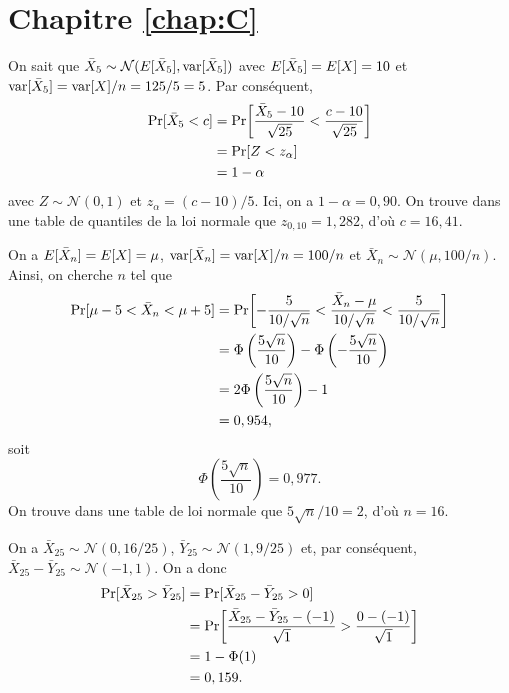 \section*{Chapitre \ref{chap:C}}

\begin{solution}{2.1}
    On sait que $\bar{X}_{5} \sim \mathcal{N}(E [ \bar{X}_{5} ], \mathrm{var} [ \bar{X}_{5} ])$ avec
      $E [ \bar{X}_{5} ] = E [ X ] = 10$ et $\mathrm{var} [ \bar{X}_{5} ] = \mathrm{var} [ X ]/n =
      125/5 = 5$. Par conséquent,
    \begin{align*}
      \prob{\bar{X}_{5} < c}
      &= \Prob{\frac{\bar{X}_{5} - 10}{\sqrt{25}} < %
        \frac{c - 10}{\sqrt{25}}} \\
      &= \prob{Z < z_\alpha} \\
      &= 1 - \alpha
    \end{align*}
    avec $Z \sim \mathcal{N}(0, 1)$ et $z_\alpha = (c - 10)/5$. Ici, on a $1 -
    \alpha = 0,90$. On trouve dans une table de quantiles de la loi
    normale que $z_{0,10} = 1,282$, d'où $c = 16,41$.
  
\end{solution}
\begin{solution}{2.2}
    On a $E [ \bar{X}_n ] = E [ X ] = \mu$, $\mathrm{var} [ \bar{X}_n ] = \mathrm{var} [ X ]/n =
    100/n$ et $\bar{X}_n\sim \mathcal{N}(\mu, 100/n)$. Ainsi, on cherche $n$ tel
    que
    \begin{align*}
      \prob{\mu - 5 < \bar{X}_n< \mu + 5}
      &= \Prob{-\frac{5}{10/\sqrt{n}} < %
        \frac{\bar{X}_n- \mu}{10/\sqrt{n}} < %
        \frac{5}{10/\sqrt{n}}} \\
      &= \Phi\left( \frac{5 \sqrt{n}}{10} \right)
      - \Phi\left( -\frac{5 \sqrt{n}}{10} \right) \\
      &= 2 \Phi\left( \frac{5\sqrt{n}}{10} \right) - 1 \\
      &= 0,954,
    \end{align*}
    soit
    \begin{equation*}
     \Phi \left( \frac{5\sqrt{n}}{10} \right) = 0,977.
    \end{equation*}
    On trouve dans une table de loi normale que $5 \sqrt{n}/10 = 2$,
    d'où $n = 16$.
  
\end{solution}
\begin{solution}{2.3}
    On a $\bar{X}_{25} \sim \mathcal{N}(0, 16/25)$, $\bar{Y}_{25} \sim \mathcal{N}(1, 9/25)$ et, par
    conséquent, $\bar{X}_{25} - \bar{Y}_{25} \sim \mathcal{N}(-1, 1)$. On a donc
    \begin{align*}
      \prob{\bar{X}_{25} > \bar{Y}_{25}}
      &= \prob{\bar{X}_{25} - \bar{Y}_{25} > 0} \\
      &= \Prob{\frac{\bar{X}_{25}-\bar{Y}_{25} - (-1)}{\sqrt{1}} > %
        \frac{0 - (-1)}{\sqrt{1}}} \\
      &= 1 - \Phi(1)\\
      &= 0,159.
    \end{align*}
  
\end{solution}
